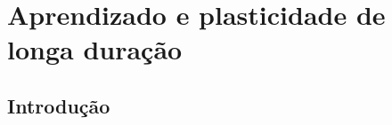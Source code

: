 \chapter{Aprendizado e plasticidade de longa duração}\label{cap:aprendizado}
\section{Introdução}\label{sec:aprendizado_intro}

